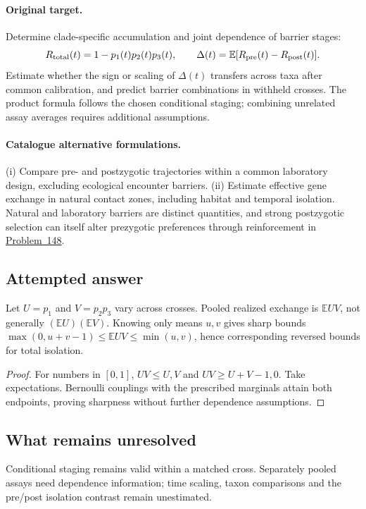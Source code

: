 \documentclass[11pt]{article}
\begin{document}
\paragraph{Original target.}
Determine clade-specific accumulation and joint dependence of barrier stages:
\[
R_{\rm total}(t)=1-p_1(t)p_2(t)p_3(t),
\qquad
\Delta(t)=\mathbb{E}[R_{\rm pre}(t)-R_{\rm post}(t)].
\]
Estimate whether the sign or scaling of $\Delta(t)$ transfers across taxa after common calibration, and predict barrier combinations in withheld crosses. The product formula follows the chosen conditional staging; combining unrelated assay averages requires additional assumptions.
\paragraph{Catalogue alternative formulations.}
(i) Compare pre- and postzygotic trajectories within a common laboratory design, excluding ecological encounter barriers. (ii) Estimate effective gene exchange in natural contact zones, including habitat and temporal isolation. Natural and laboratory barriers are distinct quantities, and strong postzygotic selection can itself alter prezygotic preferences through reinforcement in \href{https://we-solve.github.io/problems/reinforcement-a220f596/}{Problem~148}.
\subsection{Attempted answer}
\begin{proposition}
Let $U=p_1$ and $V=p_2p_3$ vary across crosses. Pooled realized exchange is $\mathbb{E} UV$, not generally $(\mathbb{E} U)(\mathbb{E} V)$. Knowing only means $u,v$ gives sharp bounds $\max(0,u+v-1)\leq\mathbb{E} UV\leq\min(u,v)$, hence corresponding reversed bounds for total isolation.
\end{proposition}
\begin{proof}
For numbers in $[0,1]$, $UV\leq U,V$ and $UV\geq U+V-1,0$. Take expectations. Bernoulli couplings with the prescribed marginals attain both endpoints, proving sharpness without further dependence assumptions.
\end{proof}
\subsection{What remains unresolved}
Conditional staging remains valid within a matched cross. Separately pooled assays need dependence information; time scaling, taxon comparisons and the pre/post isolation contrast remain unestimated.
\end{document}
